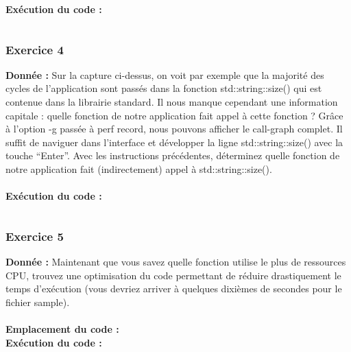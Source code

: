 \textbf{Exécution du code : } \\
\begin{lstlisting}

\end{lstlisting}

\subsubsection{Exercice 4}
\textbf{Donnée : } Sur	la	capture	ci-dessus,	on	voit	par	exemple	que	la	majorité	des	cycles	de	l'application	sont	passés	
dans	la	fonction	std::string::size() qui	est	contenue	dans	la	librairie	standard.	Il	nous	manque	
cependant	une	information	capitale :	quelle	fonction	de	notre	application	fait	appel	à	cette	fonction	?	
Grâce	à	l'option	-g passée	à	perf	record,	nous	pouvons	afficher	le	call-graph	complet.	Il	suffit	de	
naviguer	dans	l'interface	et	développer	la	ligne	std::string::size() avec	la	touche	“Enter”.	
Avec	les	instructions	précédentes,	déterminez quelle	fonction	de	notre	application	fait	(indirectement)	
appel	à	std::string::size().\\\\

\textbf{Exécution du code : } \\
\begin{lstlisting}

\end{lstlisting}

\subsubsection{Exercice 5}
\textbf{Donnée : } Maintenant	que	vous	savez	quelle	fonction	utilise	le	plus	de	ressources	CPU,	trouvez	une	optimisation	
du	code	permettant	de	réduire	drastiquement	le	temps	d'exécution	(vous	devriez	arriver	à	quelques	
dixièmes	de	secondes	pour	le	fichier	sample).\\\\
\textbf{Emplacement du code : } \textit{}\\

\textbf{Exécution du code : } \\
\begin{lstlisting}

\end{lstlisting}

